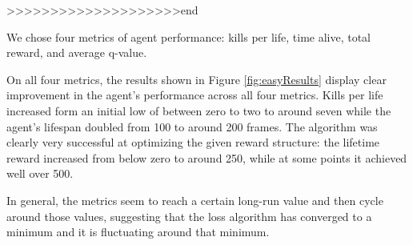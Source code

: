 \documentclass{article}
\begin{document}
\begin{multicols}{2}
>>>>>>>>>>>>>>>>>>>>end 




We chose four metrics of agent performance: kills per life, time alive, total reward, and average q-value. 

On all four metrics, the results shown in Figure \ref{fig:easyResults} display clear improvement in the agent's performance across all four metrics.
Kills per life increased form an initial low of between zero to two to around seven while the agent's lifespan doubled from 100 to around 200 frames. The algorithm was clearly very successful at optimizing the given reward structure: the lifetime reward increased from below zero to around 250, while at some points it achieved well over 500.

In general, the metrics seem to reach a certain long-run value and then cycle around those values, suggesting that the loss algorithm has converged to a minimum and it is fluctuating around that minimum.


\end{multicols}
\end{document}
